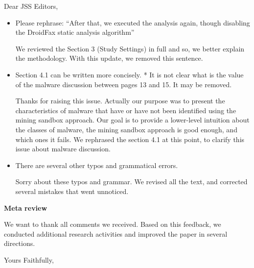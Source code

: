 \documentclass[12pt,english]{scrartcl}
\begin{document}
\begin{letter}{Dear JSS Editors,}
\begin{itemize}
\vspace{0.2cm}

\item Please rephrase: ``After that, we executed the analysis again, though disabling the DroidFax static analysis algorithm''

\vspace{0.2cm}

{\color{blue}{\bf Answer.} We reviewed the Section 3 (Study Settings) in full and so, we better explain the methodology. With this update, we removed this sentence.}

\vspace{0.2cm}

\item Section 4.1 can be written more concisely.
* It is not clear what is the value of the malware discussion between pages 13 and 15. It may be removed.

\vspace{0.2cm}

{\color{blue}{\bf Answer.} Thanks for raising this issue. Actually our purpose was to present the characteristics of malware that have or have not been identified using the mining sandbox approach. Our goal is to provide a lower-level intuition about the classes of malware, the mining sandbox approach is good enough, and which ones it fails. We rephrased the section 4.1 at this point, to clarify this issue about malware discussion.}

\vspace{0.2cm}

\item There are several other typos and grammatical errors.


\vspace{0.2cm}

{\color{blue}{\bf Answer.} Sorry about these typos and grammar. We revised all the text, and corrected several mistakes that went unnoticed.}





\end{itemize}



{\bf Meta review}

We want to thank all comments we received. Based on this feedback, we conducted additional research activities and improved the paper in several directions.

\closing{Yours Faithfully,}





\end{letter}
\end{document}
